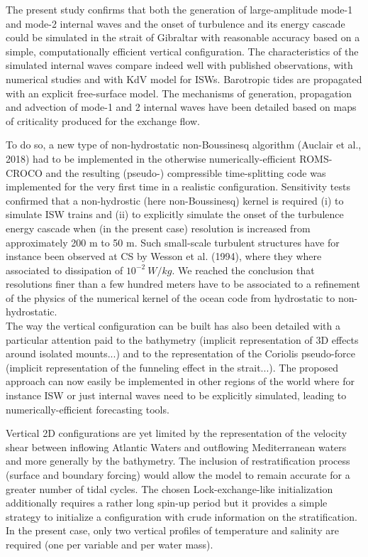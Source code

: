 The present study confirms that both the generation of large-amplitude mode-1 and mode-2 internal waves and the onset of turbulence and its energy cascade could be simulated in the strait of Gibraltar with reasonable accuracy based on a simple, computationally efficient vertical configuration. The characteristics of the simulated internal waves compare indeed well with published observations, with numerical studies and with KdV model for ISWs. Barotropic tides are propagated with an explicit free-surface model. The mechanisms of generation, propagation and advection of mode-1 and 2 internal waves have been detailed based on maps of criticality produced for the exchange flow.
 
 To do so, a new type of non-hydrostatic non-Boussinesq algorithm (Auclair et al., 2018) had to be implemented in the otherwise numerically-efficient ROMS-CROCO and the resulting (pseudo-) compressible time-splitting code was implemented for the very first time in a realistic configuration. Sensitivity tests confirmed that a non-hydrostic (here non-Boussinesq) kernel is required (i) to simulate ISW trains and (ii) to explicitly simulate the onset of the turbulence energy cascade when (in the present case) resolution is increased from approximately 200 m to 50 m. Such small-scale turbulent structures have for instance been observed at CS by Wesson et al. (1994), where they where associated to dissipation of $10^{-2}\ W/kg$. We reached the conclusion that resolutions finer than a few hundred meters have to be associated to a refinement of the physics of the numerical kernel of the ocean code from hydrostatic to non-hydrostatic.\\
 The way the vertical configuration can be built has also been detailed with a particular attention paid to the bathymetry (implicit representation of 3D effects around isolated mounts...) and to the representation of the Coriolis pseudo-force (implicit representation of the funneling effect in the strait...). The proposed approach can now easily be implemented in other regions of the world where for instance ISW or just internal waves need to be explicitly simulated, leading to numerically-efficient forecasting tools.
 
 Vertical 2D configurations are yet limited by the representation of the velocity shear between inflowing Atlantic Waters and outflowing Mediterranean waters and more generally by the bathymetry. The inclusion of restratification process (surface and boundary forcing) would allow the model to remain accurate for a greater number of tidal cycles. The chosen Lock-exchange-like initialization additionally requires a rather long spin-up period but it provides a simple strategy to initialize a configuration with crude information on the stratification. In the present case, only two vertical profiles of temperature and salinity are required (one per variable and per water mass).
 
